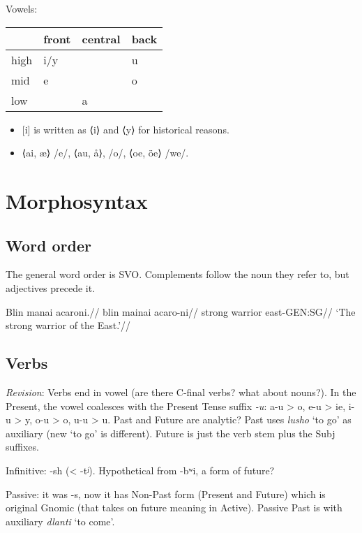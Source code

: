 \documentclass[a4paper,]{article}
\providecommand{\tightlist}{%
  \setlength{\itemsep}{0pt}\setlength{\parskip}{0pt}}
\begin{document}
Vowels:

\begin{longtable}[]{@{}llll@{}}
\toprule
& front & central & back\tabularnewline
\midrule
\endhead
high & i/y & & u\tabularnewline
mid & e & & o\tabularnewline
low & & a &\tabularnewline
\bottomrule
\end{longtable}

\begin{itemize}
\tightlist
\item
  {[}i{]} is written as ⟨i⟩ and ⟨y⟩ for historical reasons.
\item
  ⟨ai, æ⟩ /e/, ⟨au, å⟩, /o/, ⟨oe, öe⟩ /we/.
\end{itemize}

\hypertarget{morphosyntax}{%
\section{Morphosyntax}\label{morphosyntax}}

\hypertarget{word-order}{%
\subsection{Word order}\label{word-order}}

The general word order is SVO. Complements follow the noun they refer
to, but adjectives precede it.

\ex \begingl \glpreamble Blin manai acaroni.// \gla blin mainai
acaro-ni// \glb strong warrior east-GEN:SG// \glft `The strong warrior
of the East.'// \endgl \xe

\hypertarget{verbs}{%
\subsection{Verbs}\label{verbs}}

\emph{Revision}: Verbs end in vowel (are there C-final verbs? what about
nouns?). In the Present, the vowel coalesces with the Present Tense
suffix \emph{-u}: a-u \textgreater{} o, e-u \textgreater{} ie, i-u
\textgreater{} y, o-u \textgreater{} o, u-u \textgreater{} u. Past and
Future are analytic? Past uses \emph{lusho} `to go' as auxiliary (new
`to go' is different). Future is just the verb stem plus the Subj
suffixes.

Infinitive: -sh (\textless{} -tʲ). Hypothetical from -bʷi, a form of
future?

Passive: it was -s, now it has Non-Past form (Present and Future) which
is original Gnomic (that takes on future meaning in Active). Passive
Past is with auxiliary \emph{dlanti} `to come'.
\end{document}
